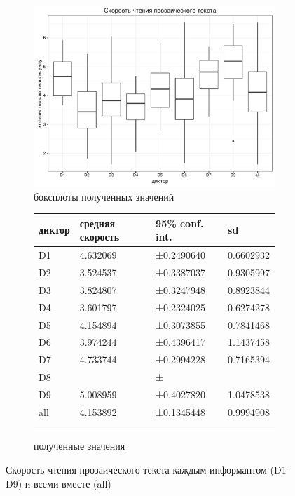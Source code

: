 \begin{figure}[t]
\begin{subfigure}[b]{0.53\textwidth}
        \includegraphics[width=\linewidth]{proseboxplot.pdf}
        \caption{боксплоты полученных значений}
\end{subfigure}
\hfill
\begin{subfigure}[b]{0.45\textwidth}
\small
\begin{tabular}{|l|l|l|l|}
\hline
диктор & средняя скорость & 95\% conf. int. & sd \\ \hline
D1 & 4.632069 & ±0.2490640 & 0.6602932 \\ \hline
D2 & 3.524537 & ±0.3387037 & 0.9305997 \\ \hline
D3 & 3.824807 & ±0.3247948 & 0.8923844 \\ \hline
D4 & 3.601797 & ±0.2324025 & 0.6274278 \\ \hline
D5 & 4.154894 & ±0.3073855 & 0.7841468 \\ \hline
D6 & 3.974244 & ±0.4396417 & 1.1437458 \\ \hline
D7 & 4.733744 & ±0.2994228 & 0.7165394 \\ \hline
D8 &  & ± &  \\ \hline
D9 & 5.008959 & ±0.4027820 & 1.0478538 \\ \hline
all & 4.153892 & ±0.1345448 & 0.9994908 \\ \hline
\multicolumn{1}{c}{}&\multicolumn{1}{c}{}&\multicolumn{1}{c}{}&\multicolumn{1}{c}{}\\
\multicolumn{1}{c}{}&\multicolumn{1}{c}{}&\multicolumn{1}{c}{}&\multicolumn{1}{c}{}\\
\end{tabular}
\normalsize
\caption{полученные значения}        
\end{subfigure}
\caption{Скорость чтения прозаического текста каждым информантом (D1-D9) и всеми вместе (all)}
\label{verseboxplot}
\end{figure}
